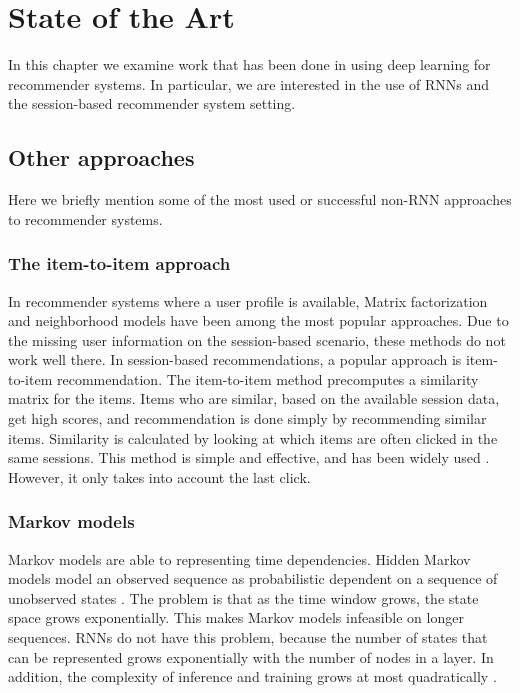 \chapter{State of the Art}
\label{chp:sota}
In this chapter we examine work that has been done in using deep learning for recommender systems. In particular, we are interested in the use of RNNs and the session-based recommender system setting.

\section{Other approaches}
Here we briefly mention some of the most used or successful non-RNN approaches to recommender systems.

\subsection{The item-to-item approach}
In recommender systems where a user profile is available, Matrix factorization and neighborhood models have been among the most popular approaches. Due to the missing user information on the session-based scenario, these methods do not work well there. In session-based recommendations, a popular approach is item-to-item recommendation. The item-to-item method precomputes a similarity matrix for the items. Items who are similar, based on the available session data, get high scores, and recommendation is done simply by recommending similar items. Similarity is calculated by looking at which items are often clicked in the same sessions. This method is simple and effective, and has been widely used \cite{DBLP:journals/corr/HidasiKBT15}. However, it only takes into account the last click.

\subsection{Markov models}
Markov models are able to representing time dependencies. Hidden Markov models model an observed sequence as probabilistic dependent on a sequence of unobserved states \cite{DBLP:journals/corr/Lipton15}. The problem is that as the time window grows, the state space grows exponentially. This makes Markov models infeasible on longer sequences. RNNs do not have this problem, because the number of states that can be represented grows exponentially with the number of nodes in a layer. In addition, the complexity of inference and training grows at most quadratically \cite{DBLP:journals/corr/Lipton15}.

